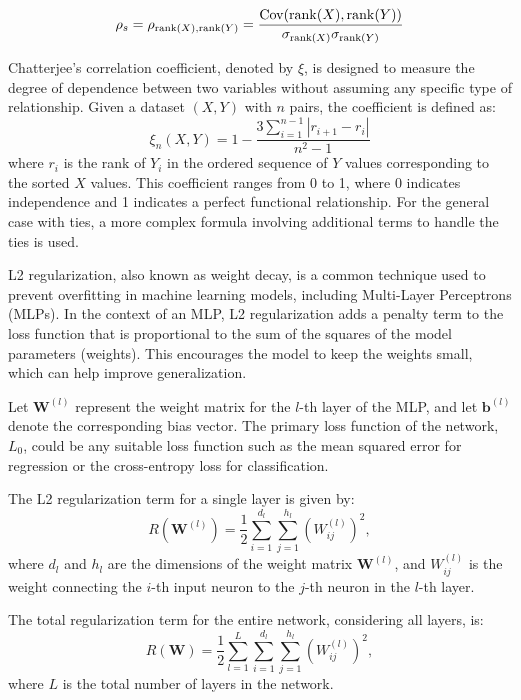 \begin{equation}\label{eq:spearman}
\rho_s = \rho_{\operatorname{rank}(X),\operatorname{rank}(Y)} = \frac{\mathrm{Cov}(\operatorname{rank}(X), \operatorname{rank}(Y))}{\sigma_{\operatorname{rank}(X)} \sigma_{\operatorname{rank}(Y)}}
\end{equation}

Chatterjee's correlation coefficient, denoted by $\xi$, is designed to measure the degree of dependence between two variables without assuming any specific type of relationship. Given a dataset $(X, Y)$ with $n$ pairs, the coefficient is defined as:
\begin{equation}
\xi_n(X,Y) = 1 - \frac{3 \sum_{i=1}^{n-1} |r_{i+1} - r_i|}{n^2 - 1}
\end{equation}
where $r_i$ is the rank of $Y_i$ in the ordered sequence of $Y$ values corresponding to the sorted $X$ values. This coefficient ranges from 0 to 1, where 0 indicates independence and 1 indicates a perfect functional relationship. For the general case with ties, a more complex formula involving additional terms to handle the ties is used.

L2 regularization, also known as weight decay, is a common technique used to prevent overfitting in machine learning models, including Multi-Layer Perceptrons (MLPs). In the context of an MLP, L2 regularization adds a penalty term to the loss function that is proportional to the sum of the squares of the model parameters (weights). This encourages the model to keep the weights small, which can help improve generalization.

Let $\mathbf{W}^{(l)}$ represent the weight matrix for the $l$-th layer of the MLP, and let $\mathbf{b}^{(l)}$ denote the corresponding bias vector. The primary loss function of the network, $L_0$, could be any suitable loss function such as the mean squared error for regression or the cross-entropy loss for classification.

The L2 regularization term for a single layer is given by:
\begin{equation}
R(\mathbf{W}^{(l)}) = \frac{1}{2} \sum_{i=1}^{d_l} \sum_{j=1}^{h_l} \left( W^{(l)}_{ij} \right)^2,
\end{equation}
where $d_l$ and $h_l$ are the dimensions of the weight matrix $\mathbf{W}^{(l)}$, and $W^{(l)}_{ij}$ is the weight connecting the $i$-th input neuron to the $j$-th neuron in the $l$-th layer.

The total regularization term for the entire network, considering all layers, is:
\begin{equation}
R(\mathbf{W}) = \frac{1}{2} \sum_{l=1}^{L} \sum_{i=1}^{d_l} \sum_{j=1}^{h_l} \left( W^{(l)}_{ij} \right)^2,
\end{equation}
where $L$ is the total number of layers in the network.

